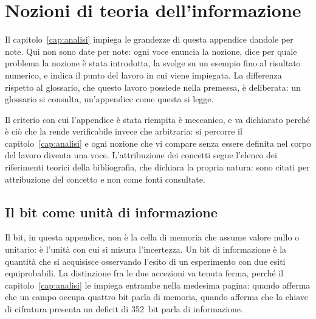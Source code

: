 
\chapter{Nozioni di teoria dell'informazione}
\label{app:informazione}

Il capitolo~\ref{cap:analisi} impiega le grandezze di questa appendice dandole per note. Qui non sono date per note: ogni voce enuncia la nozione, dice per quale problema la nozione è stata introdotta, la svolge su un esempio fino al risultato numerico, e indica il punto del lavoro in cui viene impiegata. La differenza rispetto al glossario, che questo lavoro possiede nella premessa, è deliberata: un glossario si consulta, un'appendice come questa si legge.

Il criterio con cui l'appendice è stata riempita è meccanico, e va dichiarato perché è ciò che la rende verificabile invece che arbitraria: si percorre il capitolo~\ref{cap:analisi} e ogni nozione che vi compare senza essere definita nel corpo del lavoro diventa una voce. L'attribuzione dei concetti segue l'elenco dei riferimenti teorici della bibliografia, che dichiara la propria natura: sono citati per attribuzione del concetto e non come fonti consultate.

\section{Il bit come unità di informazione}

Il bit, in questa appendice, non è la cella di memoria che assume valore nullo o unitario: è l'unità con cui si misura l'incertezza. Un bit di informazione è la quantità che si acquisisce osservando l'esito di un esperimento con due esiti equiprobabili. La distinzione fra le due accezioni va tenuta ferma, perché il capitolo~\ref{cap:analisi} le impiega entrambe nella medesima pagina: quando afferma che un campo occupa quattro bit parla di memoria, quando afferma che la chiave di cifratura presenta un deficit di \SI{352}{bit} parla di informazione.

